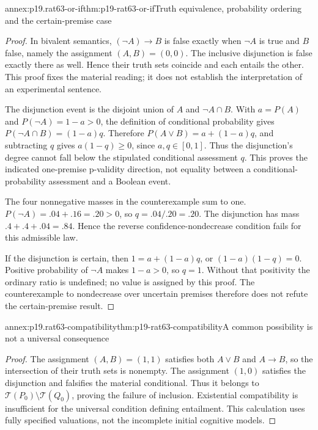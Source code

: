 \begin{annexitem}{annex:p19.rat63-or-if}{thm:p19-rat63-or-if}{Truth equivalence, probability ordering and the certain-premise case}
\begin{proof}
In bivalent semantics, \((\neg A)\to B\) is false exactly
when \(\neg A\) is true and \(B\) false, namely the assignment
\((A,B)=(0,0)\). The inclusive disjunction is false exactly there
as well. Hence their truth sets coincide and each entails the other.
This proof fixes the material reading; it does not establish the
interpretation of an experimental sentence.

The disjunction event is the disjoint union of \(A\) and
\(\neg A\cap B\). With \(a=P(A)\) and \(P(\neg A)=1-a>0\),
the definition of conditional probability gives
\(P(\neg A\cap B)=(1-a)q\). Therefore
\(P(A\lor B)=a+(1-a)q\), and subtracting \(q\) gives
\(a(1-q)\ge0\), since \(a,q\in[0,1]\). Thus the disjunction's
degree cannot fall below the stipulated conditional assessment \(q\).
This proves the indicated one-premise p-validity direction, not equality
between a conditional-probability assessment and a Boolean event.

The four nonnegative masses in the counterexample sum to one.
\(P(\neg A)=.04+.16=.20>0\), so \(q=.04/.20=.20\).
The disjunction has mass \(.4+.4+.04=.84\). Hence the reverse
confidence-nondecrease condition fails for this admissible law.

If the disjunction is certain, then
\(1=a+(1-a)q\), or \((1-a)(1-q)=0\). Positive probability
of \(\neg A\) makes \(1-a>0\), so \(q=1\).
Without that positivity the ordinary ratio is undefined; no value
is assigned by this proof. The counterexample to nondecrease over
uncertain premises therefore does not refute the certain-premise result.
\end{proof}
\end{annexitem}

\begin{annexitem}{annex:p19.rat63-compatibility}{thm:p19-rat63-compatibility}{A common possibility is not a universal consequence}
\begin{proof}
The assignment \((A,B)=(1,1)\) satisfies both \(A\lor B\)
and \(A\to B\), so the intersection of their truth sets is
nonempty. The assignment \((1,0)\) satisfies the disjunction
and falsifies the material conditional. Thus it belongs to
\(\mathcal T(P_0)\setminus\mathcal T(Q_0)\), proving the failure
of inclusion. Existential compatibility is insufficient for the
universal condition defining entailment. This calculation uses fully
specified valuations, not the incomplete initial cognitive models.
\end{proof}
\end{annexitem}

